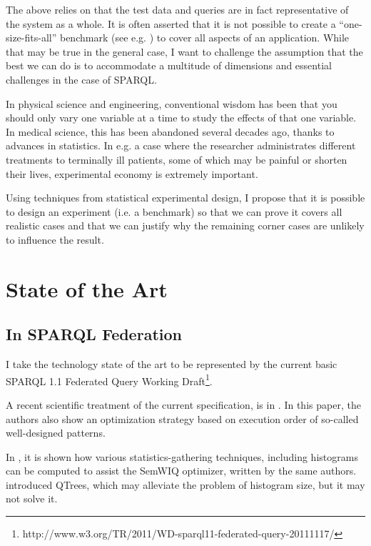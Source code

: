 \documentclass{llncs}
\begin{document}
The above relies on that the test data and queries are in fact
representative of the system as a whole. It is often asserted that it
is not possible to create a ``one-size-fits-all'' benchmark (see
e.g. \cite{Schmidt:2011:FBS:2063016.2063054}) to cover all aspects of
an application. While that may be true in the general case, I want to
challenge the assumption that the best we can do is to accommodate a
multitude of dimensions and essential challenges in the case of
SPARQL.

In physical science and engineering, conventional wisdom has been that
you should only vary one variable at a time to study the effects of
that one variable. In medical science, this has been abandoned several
decades ago, thanks to advances in statistics. In e.g. a case where
the researcher administrates different treatments to terminally ill
patients, some of which may be painful or shorten their lives,
experimental economy is extremely important.

Using techniques from statistical experimental design, I propose
that it is possible to design an experiment (i.e. a benchmark) so that
we can prove it covers all realistic cases and that we can justify
why the remaining corner cases are unlikely to influence the result.


\section{State of the Art}

\subsection{In SPARQL Federation}

I take the technology state of the art to be represented by the
current basic SPARQL 1.1 Federated Query Working
Draft\footnote{http://www.w3.org/TR/2011/WD-sparql11-federated-query-20111117/}. 

A recent scientific treatment of the current specification, is in
\cite{springerlink:10.1007/978-3-642-21064-8-1}. In this paper, the
authors also show an optimization strategy based on execution order of
so-called well-designed patterns.

In \cite{5337556}, it is shown how various statistics-gathering
techniques, including histograms can be computed to assist the SemWIQ
optimizer, written by the same authors.
\cite{Harth:2010:DSO:1772690.1772733} introduced QTrees, which may
alleviate the problem of histogram size, but it may not solve it.
\end{document}
